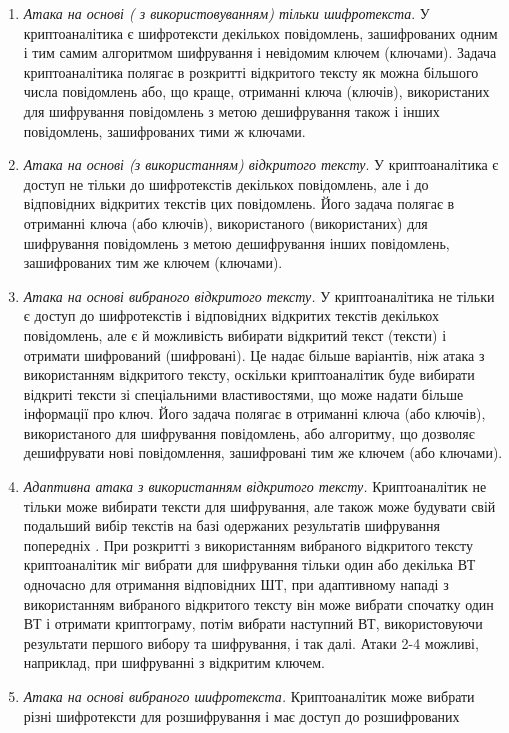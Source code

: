 \documentclass[a4paper]{article}
\newcommand\liststyleWWviiiNumii{%
\renewcommand\theenumi{\arabic{enumi}}
\renewcommand\theenumii{\arabic{enumii}}
\renewcommand\theenumiii{\arabic{enumiii}}
\renewcommand\theenumiv{\arabic{enumiv}}
\renewcommand\labelenumi{\theenumi.}
\renewcommand\labelenumii{\theenumii.}
\renewcommand\labelenumiii{\theenumiii.}
\renewcommand\labelenumiv{\theenumiv.}
}
\newcounter{}
\begin{document}
\liststyleWWviiiNumii
\begin{enumerate}
\item \textit{Атака на основі ( з використовуванням) тільки шифротекста}. У
криптоаналітика є шифротексти декількох повідомлень, зашифрованих одним і тим
самим алгоритмом шифрування і невідомим ключем (ключами). Задача
криптоаналітика полягає в розкритті відкритого тексту як можна більшого числа
повідомлень або, що краще, отриманні ключа (ключів), використаних для
шифрування повідомлень з метою  дешифрування також і інших повідомлень,
зашифрованих тими ж ключами.
\item \textit{Атака на основі (з використанням) відкритого тексту}. У
криптоаналітика є доступ не тільки до шифротекстів декількох повідомлень, але і
до відповідних відкритих текстів цих повідомлень. Його задача полягає в
отриманні ключа (або ключів), використаного (використаних) для шифрування
повідомлень з метою дешифрування інших повідомлень, зашифрованих тим же ключем
(ключами).
\item \textit{Атака на основі вибраного відкритого тексту.} У криптоаналітика не
тільки є доступ до шифротекстів і відповідних відкритих текстів декількох
повідомлень, але є й можливість вибирати відкритий текст (тексти) і отримати
шифрований (шифровані). Це надає більше варіантів, ніж атака з використанням
відкритого тексту, оскільки криптоаналітик буде вибирати  відкриті тексти зі
спеціальними властивостями, що може надати більше інформації про ключ. Його
задача полягає в отриманні ключа (або ключів), використаного для шифрування
повідомлень, або алгоритму, що дозволяє дешифрувати нові повідомлення,
зашифровані тим  же ключем (або ключами). 
\item \textit{Адаптивна атака з використанням відкритого тексту.} Криптоаналітик
не тільки може вибирати тексти для шифрування, але також може будувати свій
подальший вибір текстів на базі одержаних результатів шифрування попередніх .
При розкритті з використанням вибраного відкритого тексту криптоаналітик міг
вибрати для шифрування тільки один або декілька ВТ одночасно для отримання
відповідних ШТ, при адаптивному нападі з використанням вибраного відкритого
тексту він може вибрати спочатку один ВТ і отримати криптограму, потім вибрати
наступний ВТ, використовуючи результати першого вибору та шифрування, і так
далі. Атаки 2-4 можливі, наприклад, при шифруванні з відкритим ключем.
\item \textit{Атака на основі вибраного шифротекста.} Криптоаналітик може
вибрати різні шифротексти для розшифрування і має доступ до розшифрованих

\end{enumerate}
\end{document}
